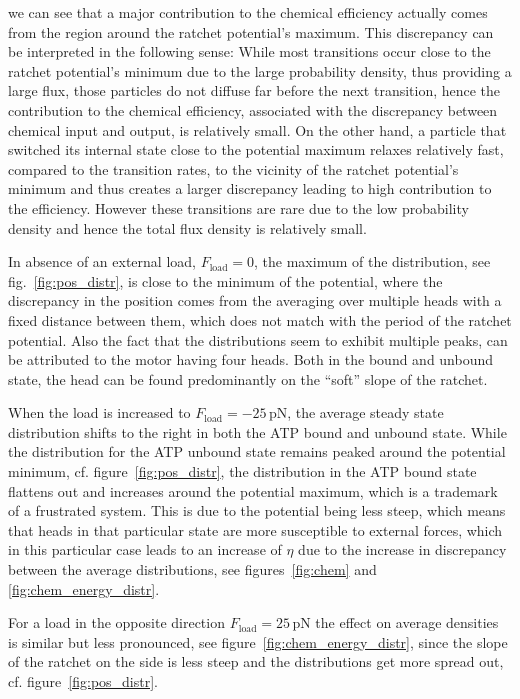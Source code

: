 \documentclass[aps,pre,twocolumn,showpacs,showkeys,superscriptaddress,floatfix]{revtex4-1}
\begin{document}
we can see that a major contribution to the chemical efficiency actually comes from the region around the ratchet potential's maximum.
This discrepancy can be interpreted in the following sense: 
While most transitions occur close to the ratchet potential's minimum due to the large probability density, thus providing a large flux, 
those particles do not diffuse far before the next transition, 
hence the contribution to the chemical efficiency, associated with the discrepancy between chemical input and output, is relatively small. 
On the other hand, a particle that switched its internal state close to the potential maximum relaxes relatively fast, compared to the transition rates, 
to the vicinity of the ratchet potential's minimum and thus creates a larger discrepancy leading to high contribution to the efficiency. 
However these transitions are rare due to the low probability density and hence the total flux density is relatively small.  

In absence of an external load, $F_\text{load}=0$, 
the maximum of the distribution, see fig.~\ref{fig:pos_distr}, is close to the minimum of the potential,  
where the discrepancy in the position comes from the averaging over multiple heads with a fixed distance between them, 
which does not match with the period of the ratchet potential. 
Also the fact that the distributions seem to exhibit multiple peaks, can be attributed to the motor having four heads. 
Both in the bound and unbound state, the head can be found predominantly on the ``soft'' slope of the ratchet.

When the load is increased to $F_\text{load} = - 25 \, \mathrm{pN}$, the average steady state distribution shifts to the right in both the ATP bound and unbound state. 
While the distribution for the ATP unbound state remains peaked around the potential minimum, cf. figure~\ref{fig:pos_distr},
the distribution in the ATP bound state flattens out and increases around the potential maximum,
which is a trademark of a frustrated system.  
This is due to the potential being less steep, which means that heads in that particular state are more susceptible to external forces,  
which in this particular case leads to an increase of $\eta$ due to the increase in discrepancy between the average distributions, 
see figures~\ref{fig:chem} and \ref{fig:chem_energy_distr}. 

For a load in the opposite direction $F_\text{load}= 25 \, \mathrm{pN}$ the effect on average densities is similar but less pronounced, 
see figure~\ref{fig:chem_energy_distr}, 
since the slope of the ratchet on the side is less steep and the distributions get more spread out, cf. figure~\ref{fig:pos_distr}. 
\end{document}
